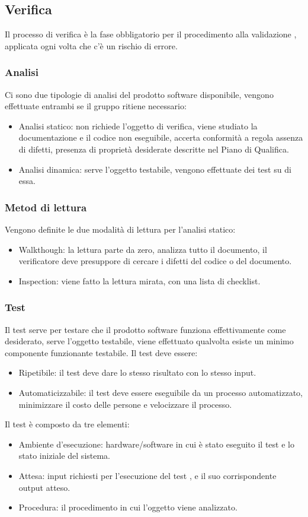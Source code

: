 \subsection{Verifica}
Il processo di verifica è la fase obbligatorio per il procedimento alla validazione , applicata ogni volta che c’è un rischio di errore.
\subsubsection{Analisi}
Ci sono due tipologie di analisi del prodotto software disponibile, vengono effettuate entrambi se il gruppo ritiene necessario:
\begin{itemize}
\item Analisi statico: non richiede l’oggetto di verifica, viene studiato la documentazione e il codice non eseguibile, accerta conformità a regola assenza di 			difetti, presenza di proprietà desiderate descritte nel Piano di Qualifica. 
\item Analisi dinamica: serve l’oggetto testabile, vengono effettuate dei test su di essa.
\end{itemize}

\subsubsection{Metod di lettura}
Vengono definite le due modalità di lettura per l’analisi statico:
\begin{itemize}
\item Walkthough: la lettura parte da zero, analizza tutto il documento, il verificatore deve presuppore di cercare i difetti del codice o del documento.
\item Inspection: viene fatto la lettura mirata, con una lista di checklist.
\end{itemize}

\subsubsection{Test}
Il test serve per testare che il prodotto software funziona effettivamente come desiderato, serve l’oggetto testabile, viene effettuato qualvolta esiste un minimo componente funzionante testabile.
Il test deve essere: 
\begin{itemize}
\item Ripetibile: il test deve dare lo stesso risultato con lo stesso input. 
\item Automaticizzabile: il test deve essere eseguibile da un processo automatizzato, minimizzare il costo delle persone e velocizzare il processo.
\end{itemize}
Il test è composto da tre elementi:
\begin{itemize}
\item Ambiente d’esecuzione: hardware/software in cui è stato eseguito il test e lo stato iniziale del sistema.
\item Attesa: input richiesti per l’esecuzione del test , e il suo corrispondente output atteso.
\item Procedura: il procedimento in cui l’oggetto viene analizzato.
\end{itemize}

